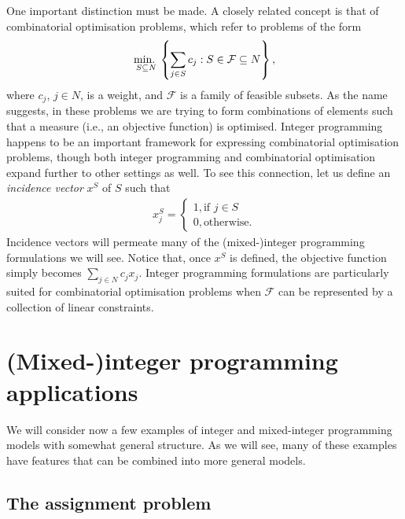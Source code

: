 One important distinction must be made. A closely related concept is that of combinatorial optimisation problems, which refer to problems of the form
%
\begin{align*}
 	\mathop{\text{min.~}}_{S \subseteq N} \left\{ \sum_{j \in S} c_j : S \in \mathcal{F} \subseteq N \right \},
\end{align*}
%
where $c_j$, $j \in N$, is a weight, and $\mathcal{F}$ is a family of feasible subsets. As the name suggests, in these problems we are trying to form combinations of elements such that a measure (i.e., an objective function) is optimised. Integer programming happens to be an important framework for expressing combinatorial optimisation problems, though both integer programming and combinatorial optimisation expand further to other settings as well. To see this connection, let us define an \emph{incidence vector} $x^S$ of $S$ such that
%
  \begin{align*}
	  x^S_j = \begin{cases}
	       1, \text{if } j \in S \\ 
	       0, \text{otherwise}.
	     \end{cases}
  \end{align*}
%
Incidence vectors will permeate many of the (mixed-)integer programming formulations we will see. Notice that, once $x^S$ is defined, the objective function simply becomes $\sum_{j \in N} c_j x_j$. Integer programming formulations are particularly suited for combinatorial optimisation problems when $\mathcal{F}$ can be represented by a collection of linear constraints. 


\section{(Mixed-)integer programming applications}

We will consider now a few examples of integer and mixed-integer programming models with somewhat general structure. As we will see, many of these examples have features that can be combined into more general models.


\subsection{The assignment problem}

